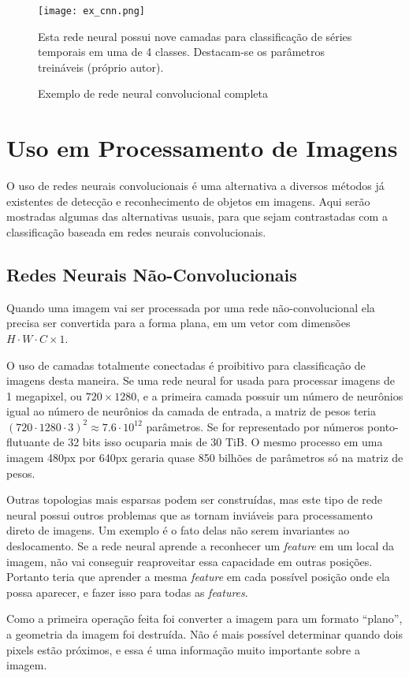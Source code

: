 \begin{figure}[!htb]
	\centering
	\texttt{[image: ex\_cnn.png]}
	\caption{Exemplo de rede neural convolucional completa}
	\label{fig:ex_cnn}
	Esta rede neural possui nove camadas para
	classificação de séries temporais em uma de 4 classes. Destacam-se os
	parâmetros treináveis (próprio autor).
\end{figure}

\section{Uso em Processamento de Imagens}
O uso de redes neurais convolucionais é uma alternativa a diversos métodos já
existentes de detecção e reconhecimento de objetos em imagens. Aqui serão
mostradas algumas das alternativas usuais, para que sejam contrastadas
com a classificação baseada em redes neurais convolucionais.

\subsection{Redes Neurais Não-Convolucionais}
Quando uma imagem vai ser processada por uma rede não-convolucional ela precisa
ser convertida para a forma plana, em um vetor com dimensões
$H \cdot W \cdot C \times 1$.

O uso de camadas totalmente conectadas é proibitivo para classificação de
imagens desta maneira. Se uma rede neural for usada para processar imagens de 1
megapixel, ou $720 \times 1280$, e a primeira camada possuir um
número de neurônios igual
ao número de neurônios da camada de entrada, a matriz de pesos teria
$(720 \cdot 1280 \cdot 3)^2 \approx 7.6 \cdot 10^{12}$ parâmetros. Se for
representado por números ponto-flutuante de 32 bits isso ocuparia mais de
30 TiB. O mesmo processo em uma imagem 480px por 640px geraria quase 850
bilhões de parâmetros só na matriz de pesos.

Outras topologias mais esparsas podem ser construídas, mas este tipo de rede
neural possui outros problemas que as tornam inviáveis para processamento direto
de imagens. Um exemplo é o fato delas não serem invariantes ao deslocamento. Se
a rede neural aprende a reconhecer um \emph{feature} em um local da
imagem, não vai
conseguir reaproveitar essa capacidade em outras posições. Portanto teria que
aprender a mesma \emph{feature} em cada possível posição onde ela possa
aparecer, e fazer isso para todas as \emph{features}.

Como a primeira operação feita foi converter a imagem para um formato “plano”, a
geometria da imagem foi destruída. Não é mais possível determinar quando dois
pixels estão próximos, e essa é uma informação muito importante sobre a imagem.

